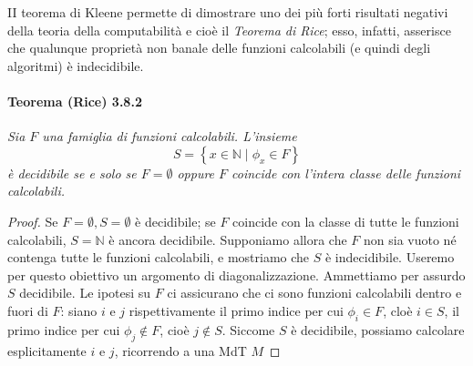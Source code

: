 II teorema di Kleene permette di
dimostrare uno dei più forti risultati negativi della teoria della computabilità e
cioè il \textit{Teorema di Rice}; esso, infatti, asserisce che qualunque proprietà non banale
delle funzioni calcolabili (e quindi degli algoritmi) è indecidibile.

\paragraph{Teorema (Rice) 3.8.2} \textit{Sia $F$ una famiglia di funzioni calcolabili. L'insieme}
$$
    S=\left\{x \in \mathbb{N} \mid \phi_x \in F\right\}
$$
\textit{è decidibile se e solo se $F=\emptyset$ oppure $F$ coincide con l'intera classe delle
    funzioni calcolabili.}

\begin{proof}
    Se $F=\emptyset, S=\emptyset$ è decidibile; se $F$ coincide con la
    classe di tutte le funzioni calcolabili, $S=\mathbb{N}$ è ancora decidibile.
    Supponiamo allora che $F$ non sia vuoto né contenga tutte le funzioni calcolabili, e
    mostriamo che $S$ è indecidibile. Useremo per questo obiettivo un argomento di
    diagonalizzazione. Ammettiamo per assurdo $S$ decidibile. Le ipotesi su $F$ ci
    assicurano che ci sono funzioni calcolabili dentro e fuori di $F$: siano $i$ e $j$
    rispettivamente il primo indice per cui $\phi_i \in F$, cloè $i \in S$, il primo
    indice per cui $\phi_j \notin F$, cioè $j \notin S$. Siccome $S$ è decidibile,
    possiamo calcolare esplicitamente $i$ e $j$, ricorrendo a una MdT $M$

\end{proof}
